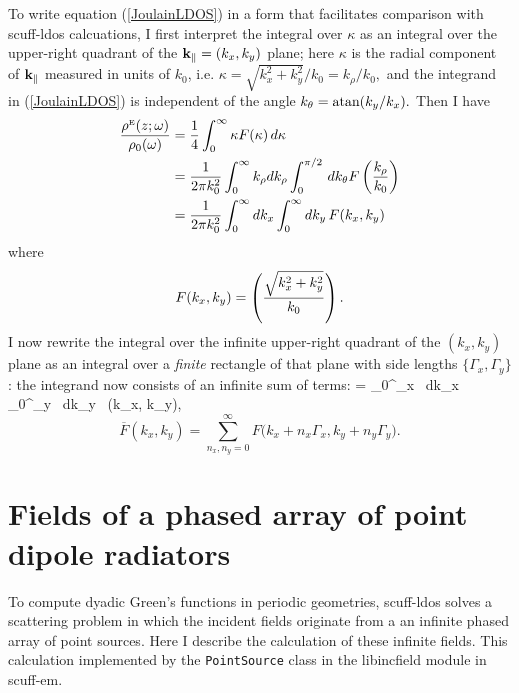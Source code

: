 \documentclass[letterpaper]{article}
\begin{document}
To write equation (\ref{JoulainLDOS}) in a form that facilitates
comparison with {\sc scuff-ldos} calcuations, I first interpret
the integral over $\kappa$ as an integral over the upper-right
quadrant of the $\mathbf{k}_\parallel=(k_x,k_y)$ plane; here
$\kappa$ is the radial component of $\mathbf{k}_\parallel$ measured in
units of $k_0$, i.e. $\kappa=\sqrt{k_x^2 + k_y^2}/k_0=k_\rho/k_0,$ 
and the integrand in (\ref{JoulainLDOS}) is independent of the 
angle $k_\theta=\text{atan}(k_y/k_x).$ Then I have
\begin{align*}
 \frac{\rho^{\hbox{\tiny{E}}}(z; \omega)}{\rho_0(\omega)}
  &=\frac{1}{4}\int_0^\infty \kappa F(\kappa) \, d\kappa
\\
  &=\frac{1}{2\pi k_0^2}
    \int_0^\infty k_\rho dk_\rho \int_0^{\pi/2} \, dk_\theta F\left(\frac{k_\rho}{k_0}\right)
\\
  &=\frac{1}{2\pi k_0^2}
    \int_0^\infty dk_x \int_0^\infty dk_y \, F(k_x, k_y)
\end{align*}
where 
$$ F(k_x, k_y)=\left(\frac{\sqrt{k_x^2 + k_y^2}}{k_0}\right).$$
I now rewrite the integral over the infinite upper-right
quadrant of the $(k_x,k_y)$ plane as an integral over a
\textit{finite} rectangle of that plane with side lengths 
$\{\Gamma_x, \Gamma_y\}$: the integrand now consists of an 
infinite sum of terms: 
{
  = 
    \int_0^{\Gamma_x} \, dk_x \, \int_0^{\Gamma_y} \, dk_y \,
    (k_x, k_y),
}
$$
    \overline{F}(k_x, k_y)=\sum_{n_x,n_y=0}^\infty 
              F\Big( k_x + n_x \Gamma_x, k_y + n_y\Gamma_y \Big).
$$

\appendix
\newpage 
\section{Fields of a phased array of point dipole radiators}
\label{DipoleFieldsAppendix}

To compute dyadic Green's functions in periodic geometries,
{\sc scuff-ldos} solves a scattering problem in which the
incident fields originate from a an infinite phased array
of point sources. Here I describe the calculation of these
infinite fields. This calculation implemented by the 
\texttt{PointSource} 
class in the {\sc libincfield} module in {\sc scuff-em}.
\end{document}
